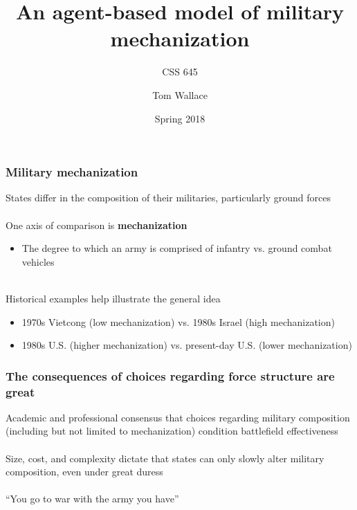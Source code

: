 \documentclass{beamer}
\title{An agent-based model of military mechanization}
\subtitle{CSS 645}
\author{Tom Wallace}
\institute{George Mason University}
\date{Spring 2018}
\begin{document}
\frame{\titlepage}

\begin{frame}
	\frametitle{Military mechanization}

	States differ in the composition of their militaries, particularly ground forces \\~\\

	One axis of comparison is \textbf{mechanization}
	\begin{itemize}
		\item \small The degree to which an army is comprised of infantry vs. ground combat vehicles \\~\\
	\end{itemize}

	Historical examples help illustrate the general idea
	\begin{itemize}
		\item \small 1970s Vietcong (low mechanization) vs. 1980s Israel (high mechanization)
		\item \small 1980s U.S. (higher mechanization) vs. present-day U.S. (lower mechanization)
	\end{itemize}
\end{frame}

\begin{frame}
	\frametitle{The consequences of choices regarding force structure are great}
	Academic and professional consensus that choices regarding military
	composition (including but not limited to mechanization) condition
	battlefield effectiveness \\~\\

	Size, cost, and complexity dictate that states can only slowly alter 
	military composition, even under great duress \\~\\

	``You go to war with the army you have'' \\~\\
\end{frame}
\end{document}
